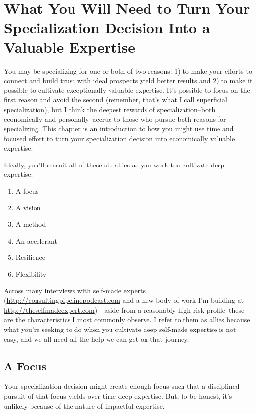 \chapter{What You Will Need to Turn Your Specialization Decision Into a Valuable Expertise}

You may be specializing for one or both of two reasons: 1) to make your efforts to connect and build trust with ideal prospects yield better results and 2) to make it possible to cultivate exceptionally valuable expertise. It's possible to focus on the first reason and avoid the second (remember, that’s what I call superficial specialization), but I think the deepest rewards of specialization--both economically and personally--accrue to those who pursue both reasons for specializing. This chapter is an introduction to how you might use time and focused effort to turn your specialization decision into economically valuable expertise.

Ideally, you'll recruit all of these six allies as you work too cultivate deep expertise:

\begin{enumerate}
\item A focus
\item A vision
\item A method
\item An accelerant
\item Resilience
\item Flexibility
\end{enumerate}

Across many interviews with self-made experts (\href{http://consultingpipelinepodcast.com}{http://consultingpipelinepodcast.com} and a new body of work I’m building at \href{http://theselfmadeexpert.com}{http://theselfmadeexpert.com})—aside from a reasonably high risk profile--these are the characteristics I most commonly observe. I refer to them as allies because what you're seeking to do when you cultivate deep self-made expertise is not easy, and we all need all the help we can get on that journey.

\section{A Focus}

Your specialization decision might create enough focus such that a disciplined pursuit of that focus yields over time deep expertise. But, to be honest, it's unlikely because of the nature of impactful expertise.

